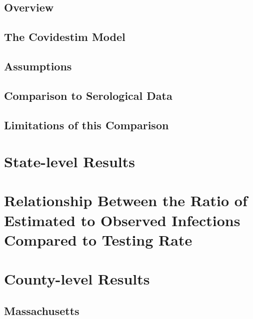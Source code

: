 \documentclass[12pt,twoside]{smiththesis}
\begin{document}
\hypertarget{overview-2}{%
\subsection{Overview}\label{overview-2}}

\hypertarget{the-covidestim-model}{%
\subsection{The Covidestim Model}\label{the-covidestim-model}}

\hypertarget{assumptions}{%
\subsection{Assumptions}\label{assumptions}}

\hypertarget{comparison-to-serological-data}{%
\subsection{Comparison to Serological Data}\label{comparison-to-serological-data}}

\hypertarget{lims}{%
\subsection{Limitations of this Comparison}\label{lims}}

\hypertarget{state-level-results}{%
\section{State-level Results}\label{state-level-results}}

\hypertarget{relationship-between-the-ratio-of-estimated-to-observed-infections-compared-to-testing-rate}{%
\section{Relationship Between the Ratio of Estimated to Observed Infections Compared to Testing Rate}\label{relationship-between-the-ratio-of-estimated-to-observed-infections-compared-to-testing-rate}}

\hypertarget{county-level-results}{%
\section{County-level Results}\label{county-level-results}}

\hypertarget{massachusetts}{%
\subsection{Massachusetts}\label{massachusetts}}
\end{document}

